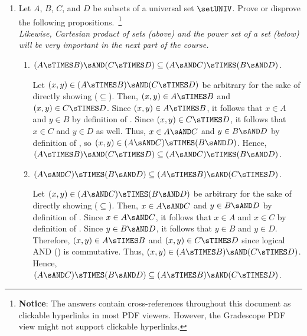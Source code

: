 \begin{enumerate}
  \newpage
  \item Let $A$, $B$, $C$, and $D$ be subsets of a universal set $\setUNIV$. 
  Prove or disprove the following propositions.~\footnote{
    \textbf{Notice}: The answers contain cross-references throughout this document as clickable hyperlinks in most PDF viewers. 
    However, the Gradescope PDF view might not support clickable hyperlinks.
  }\\
  \textit{Likewise, Cartesian product of sets (above) and the power set of a set (below) will be very important in the next part of the course.}
  \begin{enumerate}
    \item $(A \sTIMES B) \sAND(C \sTIMES D) \subseteq(A \sAND C) \sTIMES(B \sAND D)$.
    \begin{subprove}
      Let $(x,y) \in (A \sTIMES B) \sAND(C \sTIMES D)$ be arbitrary for the sake of directly showing ($\subseteq$). 
      Then, $(x,y) \in A \sTIMES B$ and $(x,y) \in C \sTIMES D$. 
      Since $(x,y) \in A \sTIMES B$, it follows that $x \in A$ 
      and $y \in B$ by definition of . Since $(x,y) \in C \sTIMES D$, it follows 
      that $x \in C$ and $y \in D$ as well.
      Thus, $x \in A \sAND C$ 
      and $y \in B \sAND D$ by definition of , 
      so $(x,y) \in (A \sAND C) \sTIMES(B \sAND D)$.
      Hence, $(A \sTIMES B) \sAND(C \sTIMES D) \subseteq(A \sAND C) \sTIMES(B \sAND D)$.
    \end{subprove}

    \item $(A \sAND C) \sTIMES(B \sAND D) \subseteq(A \sTIMES B) \sAND(C \sTIMES D)$.
    \begin{subprove}
      Let $(x,y) \in (A \sAND C) \sTIMES(B \sAND D)$ be arbitrary for the sake of directly showing ($\subseteq$). 
      Then, $x \in A \sAND C$ and $y \in B \sAND D$ by definition of . 
      Since $x \in A \sAND C$, it follows that $x \in A$ and $x \in C$ by definition of . 
      Since $y \in B \sAND D$, it follows that $y \in B$ and $y \in D$.
      Therefore, $(x,y) \in A \sTIMES B$ and $(x,y) \in C \sTIMES D$ since logical AND (\AND) is commutative.
      Thus, $(x,y) \in (A \sTIMES B) \sAND(C \sTIMES D)$.
      Hence, $(A \sAND C) \sTIMES(B \sAND D) \subseteq(A \sTIMES B) \sAND(C \sTIMES D)$.
    \end{subprove}


\end{enumerate}
\end{enumerate}
